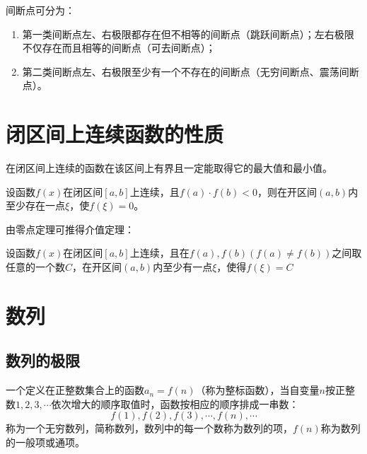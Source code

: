 间断点可分为：
\begin{enumerate}
    \item 第一类间断点\quad 左、右极限都存在但不相等的间断点（跳跃间断点）；左右极限不仅存在而且相等的间断点（可去间断点）；

    \item 第二类间断点\quad 左、右极限至少有一个不存在的间断点（无穷间断点、震荡间断点）。
\end{enumerate}

\section{闭区间上连续函数的性质}
\begin{theorem}[有界性与最大值最小值定理] \label{theorem:max_and_min_value}
    在闭区间上连续的函数在该区间上有界且一定能取得它的最大值和最小值。
\end{theorem}

\begin{theorem}[零点定理] \label{thm:root_theorem}
    设函数$f(x)$在闭区间$[a,b]$上连续，且$f(a)\cdot f(b)<0$，则在开区间$(a,b)$内至少存在一点$\xi$，使$f(\xi)=0$。
\end{theorem}

由零点定理可推得介值定理：
\begin{theorem}[介值定理] \label{thm:the_intermediate_value_theorem}
    设函数$f(x)$在闭区间$[a,b]$上连续，且在$f(a),f(b)(f(a)\neq f(b))$之间取任意的一个数$C$，在开区间$(a,b)$内至少有一点$\xi$，使得$f(\xi)=C$
\end{theorem}

\section{数列}
\subsection{数列的极限}
一个定义在正整数集合上的函数$a_n=f(n)$（称为整标函数），当自变量$n$按正整数$1,2,3,\cdots$依次增大的顺序取值时，函数按相应的顺序排成一串数：
\begin{equation}
    f(1),f(2),f(3),\cdots,f(n),\cdots \nonumber
\end{equation}
称为一个无穷数列，简称数列，数列中的每一个数称为数列的项，$f(n)$称为数列的一般项或通项。

